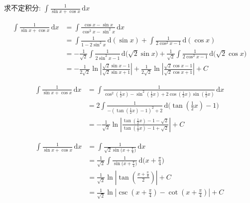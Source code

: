 \documentclass[color=green,titlestyle=hang]{elegantbook}%
\begin{document}
\begin{exercise}
求不定积分: $\int\frac{1}{\sin x+\cos x}\,\mathrm{d}x$
\end{exercise}\begin{Solution}
\begin{align*}\int\frac{1}{\sin x+\cos x}\,\mathrm{d}x&=\int\frac{\cos x-\sin x}{\cos^2x-\sin^2x}\,\mathrm{d}x\\
&=\int\frac{1}{1-2\sin^2x}\,\mathrm{d}(\sin x)+\int\frac{1}{2\cos^2x-1}\,\mathrm{d}(\cos x)\\
&=-\frac{1}{\sqrt{2}}\int\frac{1}{2\sin^2x-1}\,\mathrm{d}\big(\sqrt{2}\sin x\big)+\frac{1}{\sqrt{2}}\int\frac{1}{2\cos^2x-1}\,\mathrm{d}\big(\sqrt{2}\cos x\big)\\
&=-\frac{1}{2\sqrt{2}}\ln\left|\frac{\sqrt{2}\sin x-1}{\sqrt{2}\sin x+1}\right|+\frac{1}{2\sqrt{2}}\ln\left|\frac{\sqrt{2}\cos x-1}{\sqrt{2}\cos x+1}\right|+C
\end{align*}	
\end{Solution}\begin{Solution}
\begin{align*}\int\frac{1}{\sin x+\cos x}\,\mathrm{d}x&=\int\frac{1}{\cos^2\left(\frac{1}{2}x\right)-\sin^2\left(\frac{1}{2}x\right)+2\cos\left(\frac{1}{2}x\right)\sin\left(\frac{1}{2}x\right)}\,\mathrm{d}x\\
&=2\int\frac{1}{-\left(\tan\left(\frac{1}{2}x\right)-1\right)^2+2}\,\mathrm{d}\big(\tan\left(\tfrac{1}{2}x\right)-1\big)\\
&=-\frac{1}{\sqrt{2}}\ln\left|\frac{\tan\left(\tfrac{1}{2}x\right)-1-\sqrt{2}}{\tan\left(\tfrac{1}{2}x\right)-1+\sqrt{2}}\right|+C
\end{align*}	
\end{Solution}\begin{Solution}
\begin{align*}\int\frac{1}{\sin x+\cos x}\,\mathrm{d}x&=\int\frac{1}{\sqrt{2}\sin\big(x+\frac{\pi}{4}\big)}\,\mathrm{d}x\\
&=\frac{1}{\sqrt{2}}\int\frac{1}{\sin\big(x+\frac{\pi}{4}\big)}\,\mathrm{d}\Big(x+\frac{\pi}{4}\Big)\\
&=\frac{1}{\sqrt{2}}\ln\left|\tan\left(\frac{x+\frac{\pi}{4}}{2}\right)\right|+C\\
&=\frac{1}{\sqrt{2}}\ln\left|\csc\left(x+\frac{\pi}{4}\right)-\cot\left(x+\frac{\pi}{4}\right)\right|+C\\
\end{align*}	
\end{Solution}
\end{document}
